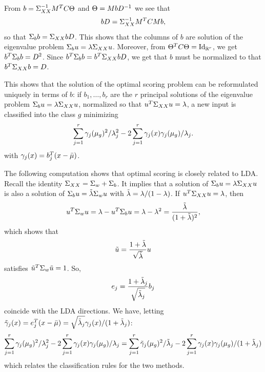 From $b = \Sigma_{XX}^{-1} M^T C \Theta$ and $\Theta = MbD^{-1}$ we see that 
\[
bD = \Sigma_{XX}^{-1} M^T C Mb ,
\]
so that $ \Sigma_b b = \Sigma_{XX} b D$.
This shows that the columns of $b$ are solution of the eigenvalue problem $\Sigma_b u = \lambda \Sigma_{XX} u$. 
Moreover, from $\Th^T C \Th = \Id[r]$, we get $b^T \Sigma_b b = D^{2}$. 
Since $b^T   \Sigma_b b = b^T\Sigma_{XX} b D$, we get that $b$ must be normalized to that $b^T\Sigma_{XX} b = D$. 

This shows that the solution of the optimal scoring problem can be reformulated uniquely in terms of $b$: 
if $b_1, \ldots, b_r$ are the $r$ principal solutions of the eigenvalue problem  $\Sigma_b u = \lambda \Sigma_{XX} u$, normalized so that $u^T \Sigma_{XX} u = \lambda$, a new input is classified into the class $g$ minimizing
\[
\sum_{j=1}^r \gamma_j(\mu_g)^2/\lambda_j^2 - 2 \sum_{j=1}^r \gamma_j(x) \gamma_j(\mu_g) /\lambda_j.
\]
with $\gamma_j(x) = b_j^T (x - \bar\mu)$. 




\bigskip

\begin{remark}
The following computation shows that optimal scoring is closely related to LDA. 
 Recall the identity $\Sigma_{XX} = \Sigma_w + \Sigma_b$.
It implies that a solution of $\Sigma_b u = \lambda \Sigma_{XX} u$ is also a solution of $\Sigma_b u = \tilde {\lambda} \Sigma_{w} u$ with $\tilde {\lambda} = \lambda/(1-\lambda)$. 
If  $u^T \Sigma_{XX} u = \lambda$, then 
\[
 u^T \Sigma_{w} u = \lambda - u^T \Sigma_{b} u = \lambda - \lambda^2 = \frac{\tilde {\lambda}}{(1+\tilde {\lambda})^2},
 \]
which shows that 
 \[
 \tilde u = \frac{1+\tilde {\lambda}}{\sqrt{\tilde{\lambda}}} u
 \]
 satisfies $\tilde u^T \Sigma_{w} \tilde u = 1$. 
So, 
 \[
 e_j = \frac{1+\tilde {\lambda}_j}{\sqrt{\tilde{\lambda}_j}} b_j
 \]
 coincide with the LDA directions.
  We have, letting $\tilde {\gamma}_j(x) = e_j^T (x - \bar\mu) = \sqrt{\tilde{\lambda}_j}\gamma_j(x)/(1+\tilde {\lambda}_j)$:
\begin{multline*}
\sum_{j=1}^r \gamma_j(\mu_g)^2/\lambda_j^2 - 2 \sum_{j=1}^r \gamma_j(x) \gamma_j(\mu_g) /\lambda_j = 
\sum_{j=1}^r \tilde {\gamma}_j(\mu_g)^2/\tilde {\lambda}_j  - 2\sum_{j=1}^r \gamma_j(x) \gamma_j(\mu_g)/ (1+\tilde {\lambda}_j) 
\end{multline*}
which relates the classification rules for the two methods.
\end{remark}

\bigskip

